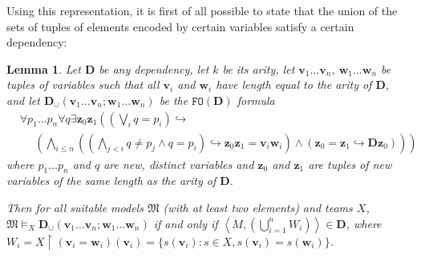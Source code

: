 \documentclass{article}
\newtheorem{Lemma}[Theorem]{Lemma}
\theoremstyle{definition}
\newcommand{\tuple}{\mathbf}
\newcommand{\FO}{\texttt{FO}}
\newcommand{\M}{\mathfrak M}
\newcommand{\D}{\mathbf D}
\begin{document}
Using this representation, it is first of all possible to state that the union of the sets of tuples of elements encoded by certain variables satisfy a certain dependency:
\begin{Lemma}
Let $\D$ be any dependency, let $k$ be its arity, let $\tuple v_1 \ldots \tuple v_n$, $\tuple w_1 \ldots \tuple w_n$ be tuples of variables such that all $\tuple v_i$ and $\tuple w_i$ have length equal to the arity of $\D$, and let $\D_\cup(\tuple v_1 \ldots \tuple v_n; \tuple w_1 \ldots \tuple w_n)$ be the $\FO(\D)$ formula 
\begin{align*}
	& \forall p_1 \ldots p_{n} \forall q \exists \tuple z_0 \tuple z_1 \left( \left(\bigvee_i q = p_i\right) \hookrightarrow \right. \\
& ~ ~ ~ ~ ~ ~ \left. \left( \bigwedge_{i \leq n} \left( \left (\bigwedge_{j < i} q \not = p_j \wedge q = p_i\right) \hookrightarrow \tuple z_0\tuple z_1 = \tuple v_i \tuple w_i\right)  \wedge (\tuple z_0 = \tuple z_1 \hookrightarrow \D \tuple z_0)\right)\right)
\end{align*}
	where $p_1 \ldots p_n$ and $q$ are new, distinct variables and $\tuple z_0$ and $\tuple z_1$ are tuples of new variables of the same length as the arity of $\D$. 

	Then for all suitable models $\M$ (with at least two elements) and teams $X$, $\M \models_X \D_\cup(\tuple v_1 \ldots \tuple v_n; \tuple w_1 \ldots \tuple w_n)$ if and only if $\left \langle M, \left(\bigcup_{i=1}^n W_i\right)\right\rangle \in \D$, where\\$W_i = X\upharpoonright (\tuple v_i = \tuple w_i) (\tuple v_i) = \{s(\tuple v_i) : s \in X, s(\tuple v_i) = s(\tuple w_i)\}$. %
	\label{lemma:union}
\end{Lemma}
\end{document}
